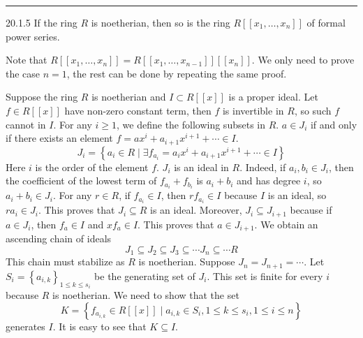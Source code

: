 \documentclass[letterpaper, 12pt]{article}
\begin{document}
\noindent\rule{7in}{2.8pt}
\begin{problem}{20.1.5}
If the ring \(R\) is noetherian, then so is the ring \(R[[x_1,\ldots,x_n]]\) of formal power series.
\end{problem}
\begin{solution}
Note that \(R[[x_1,\ldots,x_n]]=R[[x_1,\ldots,x_{n-1}]][[x_n]]\). We only need to prove the case \(n=1\), the rest can be done by repeating the same proof. 

Suppose the ring \(R\) is noetherian and \(I\subset R[[x]]\) is a proper ideal. Let \(f\in R[[x]]\) have non-zero constant term, then \(f\) is invertible in \(R\), so such \(f\) cannot in \(I\). For any \(i\geq 1\), we define the following subsets in \(R\). \(a\in J_i\) if and only if there exists an element \(f=ax^i+a_{i+1}x^{i+1}+\cdots\in I\). 
\[J_i=\left\{ a_i\in R\mid \exists f_{a_i}=a_ix^i+a_{i+1}x^{i+1}+\cdots\in I \right\}\]
Here \(i\) is the order of the element \(f\). \(J_i\) is an ideal in \(R\). Indeed, if \(a_i,b_i\in J_i\), then the coefficient of the lowest term of \(f_{a_i}+f_{b_i}\) is \(a_i+b_i\) and has degree \(i\), so \(a_i+b_i\in J_i\). For any \(r\in R\), if \(f_{a_i}\in I\), then \(rf_{a_i}\in I\) because \(I\) is an ideal, so \(ra_i\in J_i\). This proves that \(J_i\subseteq R\) is an ideal. Moreover, \(J_i\subseteq J_{i+1}\) because if \(a\in J_i\), then \(f_{a}\in I\) and \(xf_{a}\in I\). This proves that \(a\in J_{i+1}\). We obtain an ascending chain of ideals 
\[J_1\subseteq J_2\subseteq J_3\subseteq \cdots J_n\subseteq \cdots R\]
This chain must stabilize as \(R\) is noetherian. Suppose \(J_n=J_{n+1}=\cdots\). Let \(S_i=\left\{ a_{i,k} \right\}_{1\leq k\leq s_i}\) be the generating set of \(J_i\). This set is finite for every \(i\) because \(R\) is noetherian. We need to show that the set 
\[K=\left\{ f_{a_{i,k}}\in R[[x]]\mid a_{i,k}\in S_i, 1\leq k\leq s_i,1\leq i\leq n \right\}\]
generates \(I\). It is easy to see that \(K\subseteq I\). 


\end{solution}
\end{document}
